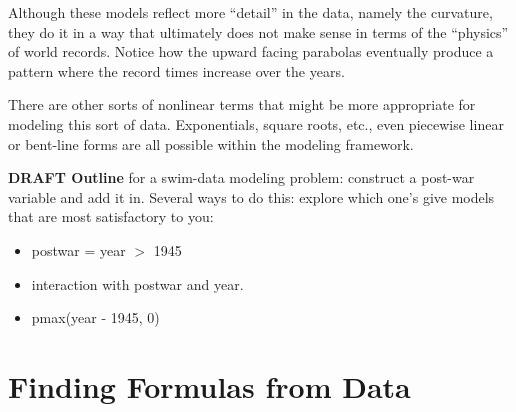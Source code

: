 \begin{knitrout}
\end{knitrout}


\begin{knitrout}
\end{knitrout}


Although these models reflect more ``detail'' in the data, namely the
curvature, they do it in a way that ultimately does not make sense in
terms of the ``physics'' of world records.
Notice how the upward facing parabolas eventually produce a pattern
where the record times increase over the years.  

There are other sorts of nonlinear terms that might be more
appropriate for modeling this sort of data.  Exponentials, square
roots, etc., even piecewise linear or bent-line forms are all
possible within the modeling framework.  


\begin{problem}
{\bf DRAFT Outline} for a swim-data modeling problem: construct a post-war
variable and add it in.  Several ways to do this: explore which one's give
models that are most satisfactory to you:
\begin{itemize}
  \item postwar = year $>$ 1945
  \item interaction with postwar and year.
  \item pmax(year - 1945, 0)
\end{itemize}
\end{problem}





\section{Finding Formulas from Data}

